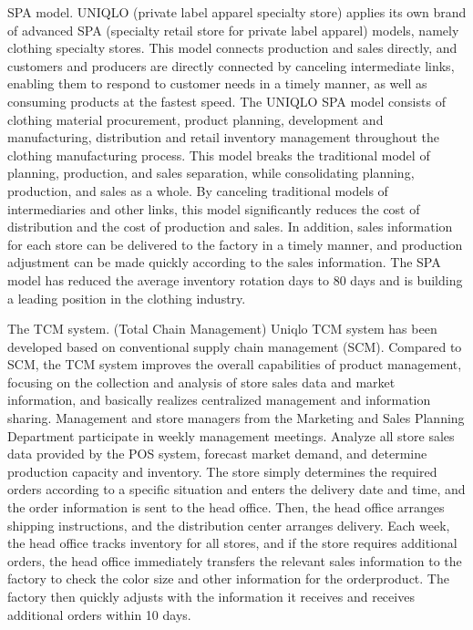 \documentclass[12pt,]{article}
\begin{document}
SPA model. UNIQLO (private label apparel specialty store) applies its
own brand of advanced SPA (specialty retail store for private label
apparel) models, namely clothing specialty stores. This model connects
production and sales directly, and customers and producers are directly
connected by canceling intermediate links, enabling them to respond to
customer needs in a timely manner, as well as consuming products at the
fastest speed. The UNIQLO SPA model consists of clothing material
procurement, product planning, development and manufacturing,
distribution and retail inventory management throughout the clothing
manufacturing process. This model breaks the traditional model of
planning, production, and sales separation, while consolidating
planning, production, and sales as a whole. By canceling traditional
models of intermediaries and other links, this model significantly
reduces the cost of distribution and the cost of production and sales.
In addition, sales information for each store can be delivered to the
factory in a timely manner, and production adjustment can be made
quickly according to the sales information. The SPA model has reduced
the average inventory rotation days to 80 days and is building a leading
position in the clothing industry.

The TCM system. (Total Chain Management) Uniqlo TCM system has been
developed based on conventional supply chain management (SCM). Compared
to SCM, the TCM system improves the overall capabilities of product
management, focusing on the collection and analysis of store sales data
and market information, and basically realizes centralized management
and information sharing. Management and store managers from the
Marketing and Sales Planning Department participate in weekly management
meetings. Analyze all store sales data provided by the POS system,
forecast market demand, and determine production capacity and inventory.
The store simply determines the required orders according to a specific
situation and enters the delivery date and time, and the order
information is sent to the head office. Then, the head office arranges
shipping instructions, and the distribution center arranges delivery.
Each week, the head office tracks inventory for all stores, and if the
store requires additional orders, the head office immediately transfers
the relevant sales information to the factory to check the color size
and other information for the orderproduct. The factory then quickly
adjusts with the information it receives and receives additional orders
within 10 days.
\end{document}
